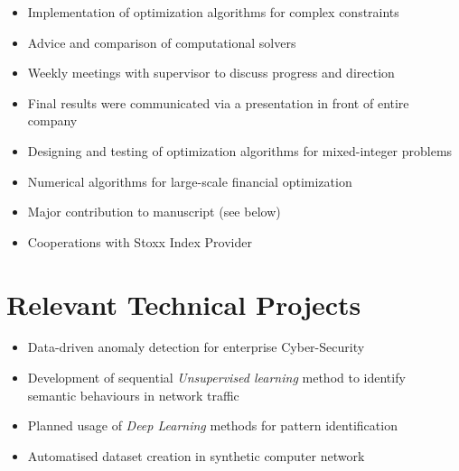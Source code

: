 \documentclass[11pt,a4paper,roman]{moderncv}   %
\begin{document}
{{{\begin{itemize}
\item Implementation of optimization algorithms for complex constraints
\item Advice and comparison of computational solvers
\item Weekly meetings with supervisor to discuss progress and direction
\item Final results were communicated via a presentation \hspace{20cm} \linebreak in front of entire company
\end{itemize}

\vspace{0.2cm}

\vspace{-0.15cm}
\begin{itemize}%

\item Designing and testing of optimization algorithms for mixed-integer problems
\item Numerical algorithms for large-scale financial optimization
\item Major contribution to manuscript (see below)
\item Cooperations with Stoxx Index Provider
\end{itemize}


\section{Relevant Technical Projects}

\vspace{0.2cm}

\vspace{-0.15cm}
\begin{itemize}%
\item Data-driven anomaly detection for enterprise Cyber-Security
\item Development of sequential \textit{Unsupervised learning} method to identify\\ semantic behaviours in network traffic
\item Planned usage of \textit{Deep Learning} methods for pattern identification
\item Automatised dataset creation in synthetic computer network
\end{itemize}

}}}
\end{document}
